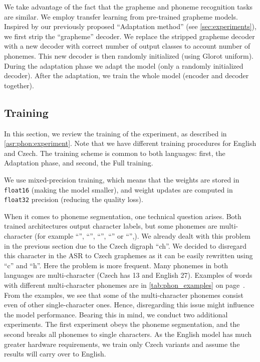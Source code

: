 We take advantage of the fact that the grapheme and phoneme recognition tasks are similar. We employ transfer learning from pre-trained grapheme models. Inspired by our previously proposed ``Adaptation method'' (see \cref{sec:experiments}), we first strip the ``grapheme'' decoder. We replace the stripped grapheme decoder with a new decoder with correct number of output classes to account number of phonemes. This new decoder is then randomly initialized (using Glorot uniform). During the adaptation phase we adapt the model (only a randomly initialized decoder). After the adaptation, we train the whole model (encoder and decoder together).

\subsection{Training}
\label{asr:phon:training}
In this section, we review the training of the experiment, as described in \cref{asr:phon:experiment}. Note that we have different training procedures for English and Czech. The training scheme is common to both languages: first, the Adaptation phase, and second, the Full training.

We use mixed-precision training, which means that the weights are stored in \texttt{float16} (making the model smaller), and weight updates are computed in \texttt{float32} precision (reducing the quality loss).

When it comes to phoneme segmentation, one technical question arises. Both trained architectures output character labels, but some phonemes are multi-character (for example ``'', ``'', ``'', ``'' or ``'',). We already dealt with this problem in the previous section due to the Czech digraph ``ch''. We decided to disregard this character in the ASR to Czech graphemes as it can be easily rewritten using ``c'' and ``h''. Here the problem is more frequent. Many phonemes in both languages are multi-character (Czech has 13 and English 27). Examples of words with different multi-character phonemes are in \cref{tab:phon_examples} on page~\pageref{tab:phon_examples}. From the examples, we see that some of the multi-character phonemes consist even of other single-character ones. Hence, disregarding this issue might influence the model performance. Bearing this in mind, we conduct two additional experiments. The first experiment obeys the phoneme segmentation, and the second breaks all phonemes to single characters. As the English model has much greater hardware requirements, we train only Czech variants and assume the results will carry over to English.

